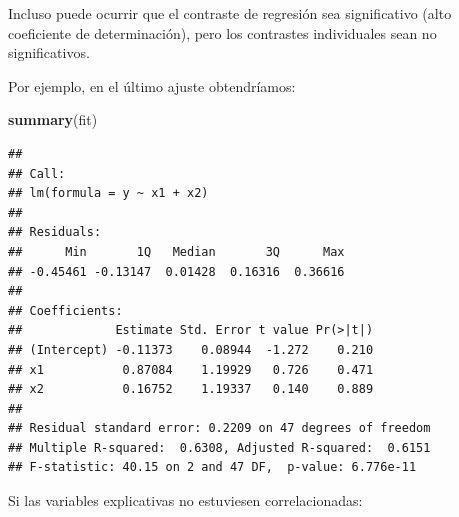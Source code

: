 \documentclass[
]{book}
\newenvironment{Shaded}{\begin{snugshade}}{\end{snugshade}}
\newcommand{\KeywordTok}[1]{\textcolor[rgb]{0.13,0.29,0.53}{\textbf{#1}}}
\newcommand{\NormalTok}[1]{#1}
\theoremstyle{break}
\theoremstyle{definition}
\theoremstyle{definition}
\theoremstyle{definition}
\theoremstyle{remark}
\begin{document}
\begin{center}\end{center}

Incluso puede ocurrir que el contraste de regresión sea significativo (alto coeficiente de determinación), pero los contrastes individuales sean no significativos.

Por ejemplo, en el último ajuste obtendríamos:

\begin{Shaded}
\begin{Highlighting}[]
\KeywordTok{summary}\NormalTok{(fit)}
\end{Highlighting}
\end{Shaded}

\begin{verbatim}
## 
## Call:
## lm(formula = y ~ x1 + x2)
## 
## Residuals:
##      Min       1Q   Median       3Q      Max 
## -0.45461 -0.13147  0.01428  0.16316  0.36616 
## 
## Coefficients:
##             Estimate Std. Error t value Pr(>|t|)
## (Intercept) -0.11373    0.08944  -1.272    0.210
## x1           0.87084    1.19929   0.726    0.471
## x2           0.16752    1.19337   0.140    0.889
## 
## Residual standard error: 0.2209 on 47 degrees of freedom
## Multiple R-squared:  0.6308, Adjusted R-squared:  0.6151 
## F-statistic: 40.15 on 2 and 47 DF,  p-value: 6.776e-11
\end{verbatim}

Si las variables explicativas no estuviesen correlacionadas:
\end{document}
